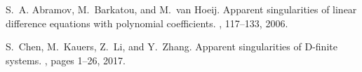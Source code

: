 \documentclass[10pt,a4paper]{article}
\begin{document}

% 
\begin{thebibliography}{10}

S.~A. Abramov, M.~Barkatou, and M.~van Hoeij.
\newblock Apparent singularities of linear difference equations with polynomial
  coefficients.
, 117--133, 2006.
% 
% 

% 
% 
% 

  
S.~Chen, M.~Kauers, Z.~Li, and Y.~Zhang.
\newblock Apparent singularities of {D}-finite systems.
, pages 1--26, 2017.
  

% 


\end{thebibliography}
\end{document}
